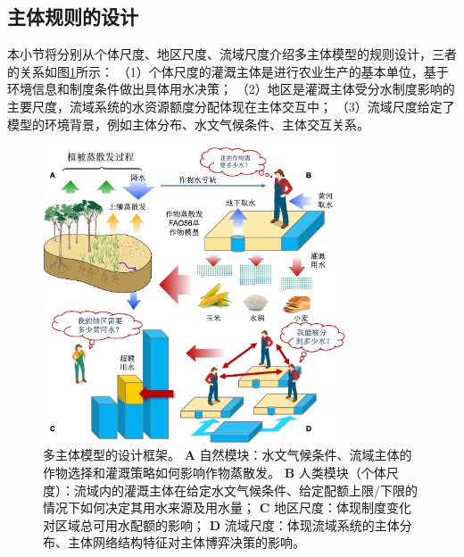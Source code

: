 
\subsection{主体规则的设计}

本小节将分别从个体尺度、地区尺度、流域尺度介绍多主体模型的规则设计，三者的关系如图\ref{ch6:fig:framework}所示：
（1）个体尺度的灌溉主体是进行农业生产的基本单位，基于环境信息和制度条件做出具体用水决策；
（2）地区是灌溉主体受分水制度影响的主要尺度，流域系统的水资源额度分配体现在主体交互中；
（3）流域尺度给定了模型的环境背景，例如主体分布、水文气候条件、主体交互关系。

\begin{figure}[!ht]
    \centering
    \includegraphics[width=0.8\textwidth]{img/ch6/ch6_framework.png}
    \caption[多主体模型的设计框架]{多主体模型的设计框架。
        \textbf{A} 自然模块：水文气候条件、流域主体的作物选择和灌溉策略如何影响作物蒸散发。
        \textbf{B} 人类模块（个体尺度）：流域内的灌溉主体在给定水文气候条件、给定配额上限/下限的情况下如何决定其用水来源及用水量；
        \textbf{C} 地区尺度：体现制度变化对区域总可用水配额的影响；
        \textbf{D} 流域尺度：体现流域系统的主体分布、主体网络结构特征对主体博弈决策的影响。
    }\label{ch6:fig:framework}
\end{figure}


